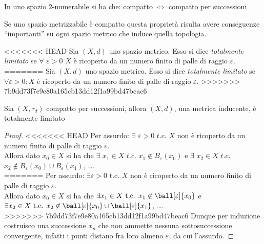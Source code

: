 \begin{prop}
\begin{cor}
In uno spazio $2$-numerabile si ha che: compatto $\iff$ compatto per successioni
\end{cor}

Se uno spazio metrizzabile è compatto questa proprietà risulta avere conseguenze ``importanti'' su ogni spazio metrico che induce quella topologia.

\begin{defn}
<<<<<<< HEAD
Sia $(X,d)$ uno spazio metrico. Esso si dice \emph{totalmente limitato} se $\forall$ $\varepsilon > 0$ $X$ è ricoperto da un numero finito di palle di raggio $\varepsilon$.
=======
Sia $(X,d)$ uno spazio metrico. Esso si dice \emph{totalmente limitato} se $\forall \varepsilon > 0:X$ è ricoperto da un numero finito di palle di raggio $\varepsilon$.
>>>>>>> 7b9dd73f7e9e80a165cb13dd12f1a99bd47beac6
\end{defn}

\begin{prop}
Sia $(X,\tau _d)$ compatto per successioni, allora $(X,d)$, una metrica inducente, è totalmente limitato
\end{prop}
\begin{proof}
<<<<<<< HEAD
Per assurdo: $\exists$ $\varepsilon > 0$ $t.c.$ $X$ non è ricoperto da un numero finito di palle di raggio $\varepsilon$.\\
Allora dato $x_0 \in X$ si ha che $\exists$ $x_1 \in X$ $t.c.$ $x_1 \not \in B_\varepsilon (x_0)$ e $\exists$ $x_2 \in X$ $t.c.$ $x_2 \not \in B_\varepsilon (x_0) \cup B_\varepsilon (x_1)$, \dots .\\
=======
Per assurdo: $\exists \varepsilon > 0 \text{ t.c. } X$ non è ricoperto da un numero finito di palle di raggio $\varepsilon$.\\
Allora dato $x_0 \in X$ si ha che $\exists x_1 \in X \text{ t.c. } x_1 \not \in \ball[\varepsilon]{x_0}$ e $\exists x_2 \in X \text{ t.c. } x_2 \not \in \ball[\varepsilon]{x_0} \cup \ball[\varepsilon]{x_1}$, \dots .\\
>>>>>>> 7b9dd73f7e9e80a165cb13dd12f1a99bd47beac6
Dunque per induzione costruisco una successione $x_n$ che non ammette nessuna sottosuccessione convergente, infatti i punti distano fra loro almeno $\varepsilon$, da cui l'assurdo.
\end{proof}


\end{prop}
